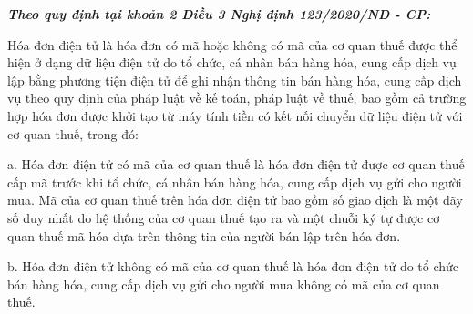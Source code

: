 





\textbf{\textit{Theo quy định tại khoản 2 Điều 3 Nghị định 123/2020/NĐ - CP:}}





Hóa đơn điện tử là hóa đơn có mã hoặc không có mã của cơ quan thuế được thể hiện ở dạng dữ liệu điện tử do tổ chức, cá nhân bán hàng hóa, cung cấp dịch vụ lập bằng phương tiện điện tử để ghi nhận thông tin bán hàng hóa, cung cấp dịch vụ theo quy định của pháp luật về kế toán, pháp luật về thuế, bao gồm cả trường hợp hóa đơn được khởi tạo từ máy tính tiền có kết nối chuyển dữ liệu điện tử với cơ quan thuế, trong đó:

a. Hóa đơn điện tử có mã của cơ quan thuế là hóa đơn điện tử được cơ quan thuế cấp mã trước khi tổ chức, cá nhân bán hàng hóa, cung cấp dịch vụ gửi cho người mua. Mã của cơ quan thuế trên hóa đơn điện tử bao gồm số giao dịch là một dãy số duy nhất do hệ thống của cơ quan thuế tạo ra và một chuỗi ký tự được cơ quan thuế mã hóa dựa trên thông tin của người bán lập trên hóa đơn.

b. Hóa đơn điện tử không có mã của cơ quan thuế là hóa đơn điện tử do tổ chức bán hàng hóa, cung cấp dịch vụ gửi cho người mua không có mã của cơ quan thuế.